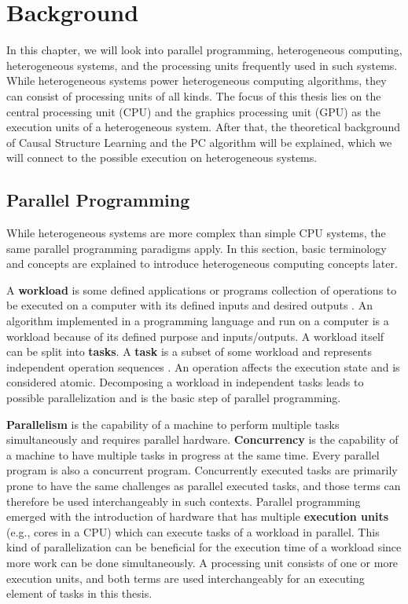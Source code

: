 \chapter{Background}
In this chapter, we will look into parallel programming, heterogeneous computing, heterogeneous systems, and the processing units frequently used in such systems. While heterogeneous systems power heterogeneous computing algorithms, they can consist of processing units of all kinds. The focus of this thesis lies on the central processing unit (CPU) and the graphics processing unit (GPU) as the execution units of a heterogeneous system.
After that, the theoretical background of Causal Structure Learning and the PC algorithm will be explained, which we will connect to the possible execution on heterogeneous systems.

\section{Parallel Programming}
While heterogeneous systems are more complex than simple CPU systems, the same parallel programming paradigms apply. In this section, basic terminology and concepts are explained to introduce heterogeneous computing concepts later.

A \textbf{workload} is some defined applications or programs collection of operations to be executed on a computer with its defined inputs and desired outputs \cite{pfister1998search}. An algorithm implemented in a programming language and run on a computer is a workload because of its defined purpose and inputs/outputs. A workload itself can be split into \textbf{tasks}. A \textbf{task} is a subset of some workload and represents independent operation sequences \cite{breshearsArtConcurrencyThread2009}. An operation affects the execution state and is considered atomic. Decomposing a workload in independent tasks leads to possible parallelization and is the basic step of parallel programming.

\textbf{Parallelism} is the capability of a machine to perform multiple tasks simultaneously and requires parallel hardware. \textbf{Concurrency} is the capability of a machine to have multiple tasks in progress at the same time. Every parallel program is also a concurrent program. Concurrently executed tasks are primarily prone to have the same challenges as parallel executed tasks, and those terms can therefore be used interchangeably in such contexts. Parallel programming emerged with the introduction of hardware that has multiple \textbf{execution units} (e.g., cores in a CPU) \cite{mattsonPatternsParallelProgramming2004} which can execute tasks of a workload in parallel. This kind of parallelization can be beneficial for the execution time of a workload since more work can be done simultaneously. A processing unit consists of one or more execution units, and both terms are used interchangeably for an executing element of tasks in this thesis.

